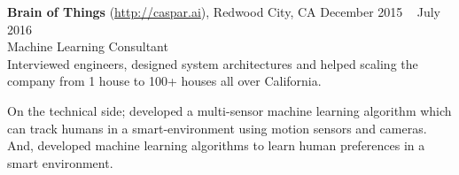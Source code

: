 \textbf{Brain of Things} (\url{http://caspar.ai}), Redwood City, CA \hfill December 2015 \textendash ~ July 2016\vspace{0mm}\\\vspace{0mm}
\hspace{-1.5mm} Machine Learning Consultant  \hfill \vspace{-5mm} \\

Interviewed engineers, designed system architectures and helped scaling the company from 1 house to 100+ houses all over California. 

On the technical side; developed a multi-sensor machine learning algorithm which can track humans in a smart-environment using motion sensors and cameras. And, developed machine learning algorithms to learn human preferences in a smart environment.